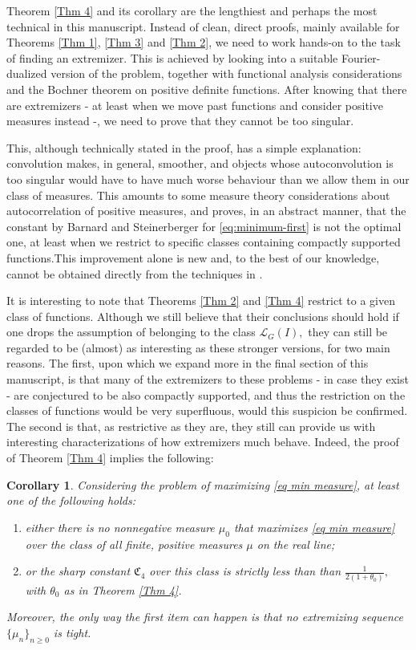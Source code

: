 \documentclass[11pt, reqno]{amsart}
\numberwithin{equation}{section}
\newtheorem{corollary}[theorem]{Corollary}
\begin{document}
Theorem \ref{Thm 4} and its corollary are the lengthiest and perhaps the most technical in this manuscript. Instead of clean, direct proofs, mainly available for Theorems \ref{Thm 1}, \ref{Thm 3} and \ref{Thm 2}, we need to work hands-on to the task of finding an extremizer. This is achieved
by looking into a suitable Fourier-dualized version of the problem, together with functional analysis considerations and the Bochner theorem on positive definite functions. After knowing that there are extremizers - at least when we move past functions and consider positive measures instead -, 
we need to prove that they cannot be too singular. 

This, although technically stated in the proof, has a simple explanation: convolution makes, in general, smoother, and objects whose autoconvolution is too singular would have to have much worse behaviour than we allow them in our class of measures. 
This amounts to some measure theory considerations about autocorrelation of positive measures, and proves, in an abstract manner, that the constant by Barnard and Steinerberger for \eqref{eq:minimum-first} is not the optimal one, at least when we restrict to specific classes containing compactly supported functions.This improvement 
alone is new and, to the best of our knowledge, cannot be obtained directly from the techniques in \cite{BarnardSteinerberger}. 

It is interesting to note that Theorems \ref{Thm 2} and \ref{Thm 4} restrict to a given class of functions. Although we still believe that their conclusions should hold if one drops the assumption of belonging to the class $\mathcal{L}_G(I),$ they can still be regarded to be (almost) as interesting as these stronger versions, for two main reasons. 
The first, upon which we expand more in the final section of this manuscript, is that many of the extremizers to these problems - in case they exist - are conjectured to be also compactly supported, and thus the restriction on the classes of functions would be very superfluous, 
would this suspicion be confirmed. The second is that, as restrictive as they are, they still can provide us with interesting characterizations of how extremizers much behave. Indeed, the proof of Theorem \ref{Thm 4} implies the following: 

\begin{corollary} Considering the problem of maximizing \eqref{eq min measure}, at least one of the following holds: 
\begin{enumerate}
 \item either there is \emph{no} nonnegative measure $\mu_0$ that maximizes \eqref{eq min measure} over the class of all finite, positive measures $\mu$ on the real line;
 \item or the sharp constant $\mathfrak{C}_4$ over this class is \emph{strictly} less than than $\frac{1}{2(1+\theta_0)},$ with $\theta_0$ as in Theorem \ref{Thm 4}.
\end{enumerate}
Moreover, the only way the first item can happen is that \emph{no} extremizing sequence $\{\mu_n\}_{n \ge 0}$ is tight. 
\end{corollary}
\end{document}

